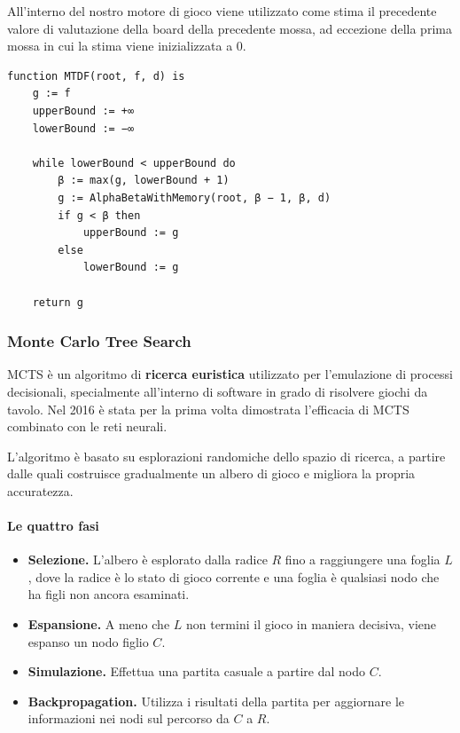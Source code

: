 \documentclass[a4paper,12pt]{article}
\begin{document}
    All'interno del nostro motore di gioco viene utilizzato come stima il precedente valore di valutazione della board della precedente mossa, ad eccezione della prima mossa in cui la stima viene inizializzata a 0.

    \begin{tcolorbox}[title=Algoritmo MTD(f)]
        \begin{Verbatim}[tabsize=2]
function MTDF(root, f, d) is
	g := f
	upperBound := +∞
	lowerBound := −∞

	while lowerBound < upperBound do
		β := max(g, lowerBound + 1)
		g := AlphaBetaWithMemory(root, β − 1, β, d)
		if g < β then
			upperBound := g 
		else
			lowerBound := g

	return g
        \end{Verbatim}
    \end{tcolorbox}

    \subsubsection{Monte Carlo Tree Search}

    MCTS è un algoritmo di \textbf{ricerca euristica} utilizzato per l'emulazione di processi decisionali, specialmente all'interno di software in grado di risolvere giochi da tavolo.
    Nel 2016 è stata per la prima volta dimostrata l'efficacia di MCTS combinato con le reti neurali.

    L'algoritmo è basato su esplorazioni randomiche dello spazio di ricerca, a partire dalle quali costruisce gradualmente un albero di gioco e migliora la propria accuratezza.

    \paragraph{Le quattro fasi} \hfill

    \begin{itemize}
        \item \textbf{Selezione.} L'albero è esplorato dalla radice $R$ fino a raggiungere una foglia $L$, dove la radice è lo stato di gioco corrente e una foglia è qualsiasi nodo che ha figli non ancora esaminati.
        \item \textbf{Espansione.} A meno che $L$ non termini il gioco in maniera decisiva, viene espanso un nodo figlio $C$.
        \item \textbf{Simulazione.} Effettua una partita casuale a partire dal nodo $C$.
        \item \textbf{Backpropagation.} Utilizza i risultati della partita per aggiornare le informazioni nei nodi sul percorso da $C$ a $R$.
    \end{itemize}
\end{document}

